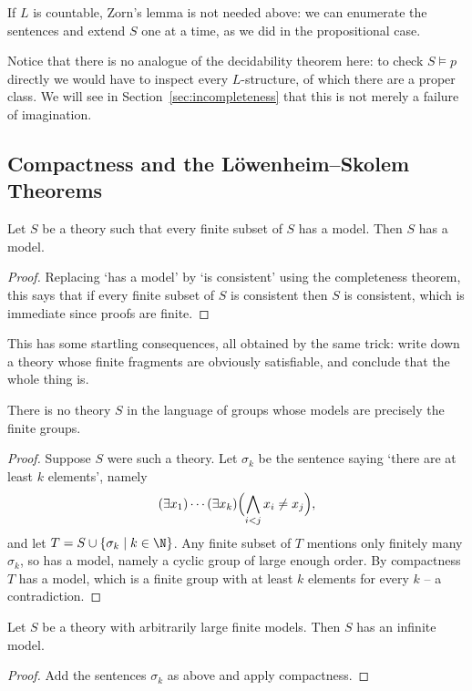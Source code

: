 \begin{remark}
  If $L$ is countable, Zorn's lemma is not needed above: we can enumerate the sentences and extend $S$ one at a time, as we did in the propositional case.
\end{remark}

Notice that there is no analogue of the decidability theorem here: to check $S \models p$ directly we would have to inspect every $L$-structure, of which there are a proper class. We will see in Section~\ref{sec:incompleteness} that this is not merely a failure of imagination.

\subsection{Compactness and the L\"owenheim--Skolem Theorems}

\begin{theorem}\label{thm:predcompactness}
  Let $S$ be a theory such that every finite subset of $S$ has a model. Then $S$ has a model.
\end{theorem}
\begin{proof}
  Replacing `has a model' by `is consistent' using the completeness theorem, this says that if every finite subset of $S$ is consistent then $S$ is consistent, which is immediate since proofs are finite.
\end{proof}

This has some startling consequences, all obtained by the same trick: write down a theory whose finite fragments are obviously satisfiable, and conclude that the whole thing is.

\begin{corollary}
  There is no theory $S$ in the language of groups whose models are precisely the finite groups.
\end{corollary}
\begin{proof}
  Suppose $S$ were such a theory. Let $\sigma_k$ be the sentence saying `there are at least $k$ elements', namely
  $$(\exists x_1)\cdots(\exists x_k)\Bigl(\bigwedge_{i < j} x_i \neq x_j\Bigr),$$
  and let $T = S \cup \{\sigma_k \mid k \in \N\}$. Any finite subset of $T$ mentions only finitely many $\sigma_k$, so has a model, namely a cyclic group of large enough order. By compactness $T$ has a model, which is a finite group with at least $k$ elements for every $k$ -- a contradiction.
\end{proof}

\begin{corollary}
  Let $S$ be a theory with arbitrarily large finite models. Then $S$ has an infinite model.
\end{corollary}
\begin{proof}
  Add the sentences $\sigma_k$ as above and apply compactness.
\end{proof}

